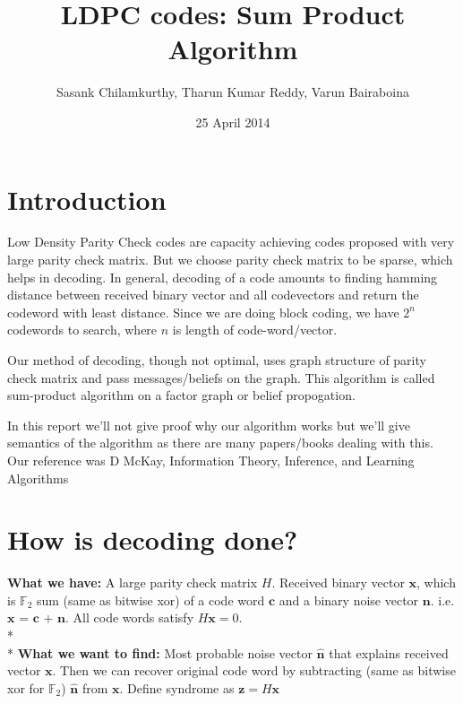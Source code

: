 \documentclass[a4paper]{article}
\title{LDPC codes: Sum Product Algorithm}
\author{Sasank Chilamkurthy, Tharun Kumar Reddy, Varun Bairaboina}
\date{25 April 2014}
\begin{document}
\maketitle



	\section{Introduction}
    Low Density Parity Check codes are capacity achieving codes proposed with very large parity check matrix. But we
    choose parity check matrix to be sparse, which helps in decoding. In general, decoding of a
    code amounts to finding hamming distance between received binary vector and all codevectors 
    and return the codeword with least distance. Since we are doing block coding, we have 
    $2^n$ codewords to search, where $n$ is length of code-word/vector.
    
    Our method of decoding, though not optimal, uses graph structure of parity check matrix and 
    pass messages/beliefs on the graph. This algorithm is called sum-product algorithm on 
    a factor graph or belief propogation. 
    
    In this report we’ll not give proof why our algorithm works but we’ll give 
    semantics of the algorithm as there are many papers/books dealing with this. Our reference 
    was D McKay, Information Theory, Inference, and Learning Algorithms 
    
    \section{How is decoding done?}
    \textbf{What we have: } A large parity check matrix $H$. Received binary vector $\mathbf{x}$, which is $\mathbb{F}_2$ sum (same as bitwise xor) of a code word $\mathbf{c}$ and a binary noise vector $\mathbf{n}$. i.e. $\mathbf{x}$ = $\mathbf{c}$ + $\mathbf{n}$. All code words satisfy $H\mathbf{x} = 0$.
    \\*
    \\*
    \textbf{What we want to find: }
    Most probable noise vector $\mathbf{\hat{n}}$ that explains received vector  $\mathbf{x}$. Then we can recover original code word by subtracting (same as bitwise xor for $\mathbb{F}_2$) $\mathbf{\hat{n}}$ from $\mathbf{x}$. Define syndrome as $\mathbf{z} = H\mathbf{x}$
    
\end{document}
